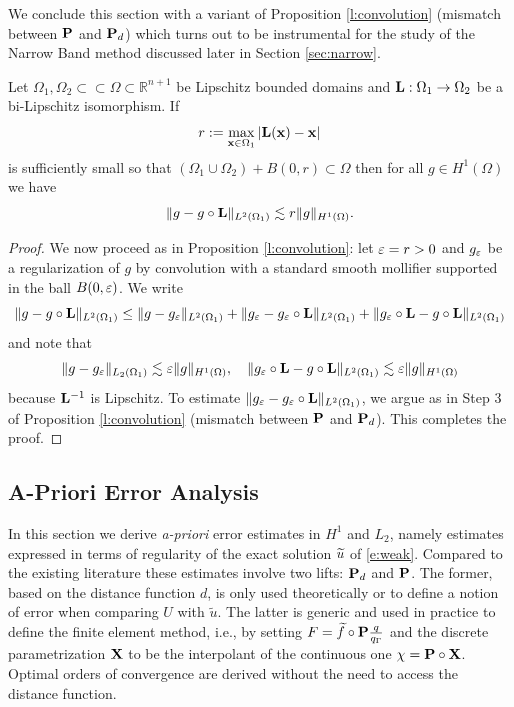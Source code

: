 We conclude this section with a variant of Proposition \ref{l:convolution}
(mismatch between ${\bf P}$ and ${\bf P}_d$) which turns out to be instrumental for the
study of the Narrow Band method discussed later in Section \ref{sec:narrow}.
%
\begin{proposition}\label{p:mol_bulk}
Let $\Omega_1,\Omega_2\subset\subset\Omega\subset\mathbb R^{n+1}$ be Lipschitz
bounded domains and ${\bf L}:\Omega_1\to\Omega_2$
be a bi-Lipschitz isomorphism. If 
%
\[
r := \max_{{\bf x}\in\Omega_1} |{\bf L}({\bf x}) - {\bf x}|
\]
%
is sufficiently small so that $(\Omega_1\cup\Omega_2)+B(0,r)\subset\Omega$
then for all $g\in H^1(\Omega)$ we have
$$
\| g - g \circ {\bf L} \|_{L^2(\Omega_1)} \lesssim r \| g \|_{H^1(\Omega)}.
$$
\end{proposition}

\begin{proof}
We now proceed as in Proposition \ref{l:convolution}:
let $\varepsilon=r >0$ and $g_{\varepsilon}$ be a regularization of $g$ by convolution with a
standard smooth mollifier supported in the ball $B(0,\varepsilon)$. We write
%
$$
\| g - g \circ {\bf L} \|_{L^2(\Omega_1)}  \leq \| g - g_{\varepsilon} \|_{L^2(\Omega_1)}
+ \| g_{\varepsilon} - g_{\varepsilon} \circ {\bf L} \|_{L^2(\Omega_1)}
+ \| g_{\varepsilon} \circ {\bf L} - g \circ {\bf L} \|_{L^2(\Omega_1)} 
$$
%
and note that
%
$$
\| g - g_{\varepsilon} \|_{L_2(\Omega_1)} \lesssim \varepsilon \| g\|_{H^1(\Omega)},
\quad
\| g_{\varepsilon} \circ {\bf L} - g \circ {\bf L} \|_{L^2(\Omega_1)} \lesssim \varepsilon \| g\|_{H^1(\Omega)}
$$
because ${\bf L}^{-1}$ is Lipschitz. 
%
To estimate $\| g_{\varepsilon} - g_{\varepsilon} \circ {\bf L} \|_{L^2(\Omega_1)}$, we argue as in Step 3 of
Proposition \ref{l:convolution} (mismatch between ${\bf P}$ and ${\bf P}_d$). This
completes the proof.
\end{proof}

\subsection{A-Priori Error Analysis}\label{S:a-priori}

In this section we derive {\it a-priori} error estimates in $H^1$ and $L_2$, namely
estimates expressed in terms of regularity of the exact solution $\widetilde{u}$ of \eqref{e:weak}.
Compared to the existing literature these estimates
involve two lifts: ${\bf P}_d$ and ${\bf P}$. The former, based on the distance function $d$, is only used theoretically or to define a notion of error when comparing $U$ with $\widetilde u$. 
The latter is generic and used in practice to define the finite element method, i.e., by setting $F = \widetilde f \circ {\bf P} \frac{q}{q_\Gamma}$ and the discrete parametrization
${\bf X}$ to be the interpolant of the continuous one $\chi={\bf P}\circ{\bf X}$.
Optimal orders of convergence are derived without the need to access the
distance function.

